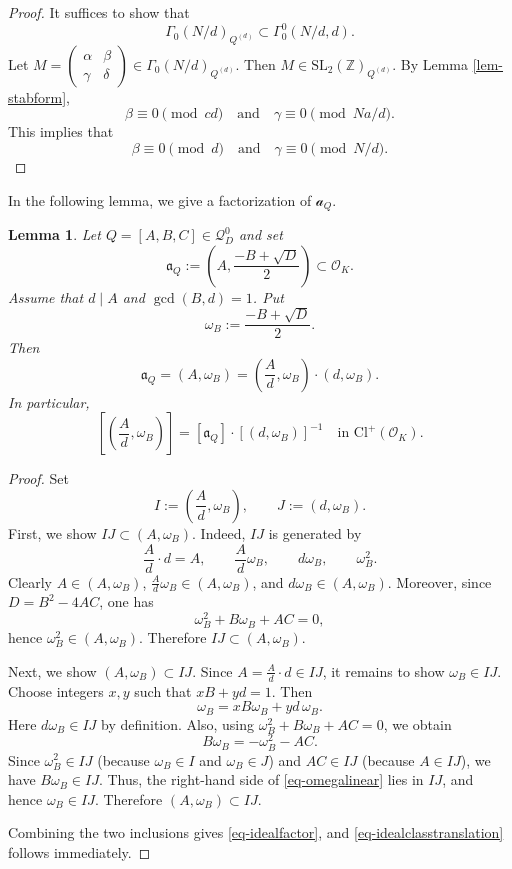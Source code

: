 \documentclass[12pt]{amsart}
\numberwithin{equation}{section}
\newtheorem{lemma}[theorem]{Lemma}
\theoremstyle{definition}
\begin{document}
\begin{proof}
    It suffices to show that
    $$\Gamma_{0}(N/d)_{Q^{(d)}}\subset\Gamma_{0}^{0}(N/d,d).$$
    Let $M=\left(\begin{smallmatrix}
        \alpha & \beta \\ \gamma & \delta
    \end{smallmatrix}\right)\in\Gamma_{0}(N/d)_{Q^{(d)}}$. Then $M\in\mathrm{SL}_{2}(\mathbb{Z})_{Q^{(d)}}$. By Lemma \ref{lem-stabform},
    $$\beta\equiv 0\pmod {cd}\quad\text{and}\quad\gamma\equiv 0\pmod{Na/d}.$$
    This implies that
    $$\beta\equiv 0\pmod{d}\quad\text{and}\quad\gamma\equiv 0\pmod{N/d}.$$
\end{proof}

In the following lemma, we give a factorization of $\mathcal{a}_{Q}$.

\begin{lemma}\label{lem-idealtranslation}
Let $Q=[A,B,C]\in\mathcal{Q}_{D}^{0}$ and set
\[
\mathfrak{a}_{Q}:=\left(A,\frac{-B+\sqrt{D}}{2}\right)\subset\mathcal{O}_{K}.
\]
Assume that $d\mid A$ and $\gcd(B,d)=1$. Put
\[
\omega_{B}:=\frac{-B+\sqrt{D}}{2}.
\]
Then
\begin{equation}\label{eq-idealfactor}
\mathfrak{a}_{Q}=(A,\omega_{B})=\left(\frac{A}{d},\omega_{B}\right)\cdot (d,\omega_{B}).
\end{equation}
In particular,
\begin{equation}\label{eq-idealclasstranslation}
\left[\left(\frac{A}{d},\omega_{B}\right)\right]=[\mathfrak{a}_{Q}]\cdot[(d,\omega_{B})]^{-1}
\quad\text{in }\mathrm{Cl}^{+}(\mathcal{O}_{K}).
\end{equation}
\end{lemma}

\begin{proof}
Set
\[
I:=\left(\frac{A}{d},\omega_{B}\right),\qquad J:=(d,\omega_{B}).
\]
First, we show $IJ\subset (A,\omega_{B})$.
Indeed, $IJ$ is generated by
\[
\frac{A}{d}\cdot d=A,\qquad \frac{A}{d}\omega_{B},\qquad d\omega_{B},\qquad \omega_{B}^{2}.
\]
Clearly $A\in (A,\omega_{B})$, $\frac{A}{d}\omega_{B}\in (A,\omega_{B})$, and $d\omega_{B}\in (A,\omega_{B})$.
Moreover, since $D=B^{2}-4AC$, one has
\[
\omega_{B}^{2}+B\omega_{B}+AC=0,
\]
hence $\omega_{B}^{2}\in (A,\omega_{B})$.
Therefore $IJ\subset (A,\omega_{B})$.

Next, we show $(A,\omega_{B})\subset IJ$.
Since $A=\frac{A}{d}\cdot d\in IJ$, it remains to show $\omega_{B}\in IJ$.
Choose integers $x,y$ such that $xB+yd=1$.
Then
\begin{equation}\label{eq-omegalinear}
\omega_{B}=xB\omega_{B}+yd\,\omega_{B}.
\end{equation}
Here $d\omega_{B}\in IJ$ by definition.
Also, using $\omega_{B}^{2}+B\omega_{B}+AC=0$, we obtain
\[
B\omega_{B}=-\omega_{B}^{2}-AC.
\]
Since $\omega_{B}^{2}\in IJ$ (because $\omega_{B}\in I$ and $\omega_{B}\in J$) and $AC\in IJ$ (because $A\in IJ$),
we have $B\omega_{B}\in IJ$.
Thus, the right-hand side of \eqref{eq-omegalinear} lies in $IJ$, and hence $\omega_{B}\in IJ$.
Therefore $(A,\omega_{B})\subset IJ$.

Combining the two inclusions gives \eqref{eq-idealfactor}, and \eqref{eq-idealclasstranslation} follows immediately.
\end{proof}
\end{document}
